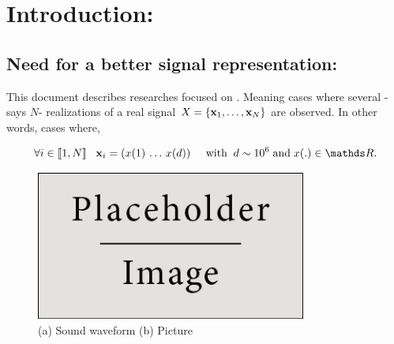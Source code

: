\documentclass[a4paper,11pt]{report}
\begin{document}
	\vfill	
		
	\newpage
	\thispagestyle{empty}
	\mbox{}
 
	\setcounter{tocdepth}{3}
	\renewcommand{\contentsname}{Contents:}
	\tableofcontents
	\clearpage

	\renewcommand{\listfigurename}{List of figures:}
	\listoffigures

\chapter{Introduction:}
	\label{chap:Intro}
		   
	\section{Need for a better signal representation:}
		\label{sec:Intro/Need}
		
		This document describes researches focused on . Meaning cases where several -says $N$- realizations of a real signal $X =\{{\bf x}_{1}, \dots , {\bf x}_{N}\}$  are observed. In other words, cases where,
			
		\begin{equation*}
			\forall i \in \llbracket 1 , N \rrbracket \;\;\; \bfx_{i}=(x(1) \, \dots  \, x(d)) \;\;\;\;\; \text{with} \;\; d \sim 10^{6} \; \text{and} \; x(.) \in \dsR.  
		\end{equation*}
		
		\begin{figure}
			\begin{center}
				\includegraphics[width=3.5in]{placeholder.jpg}
			  \caption[High dimensional signals]{(a) Sound waveform (b) Picture}
			  \label{fig:highDim signals}
			\end{center}
		\end{figure}
		
\end{document}
